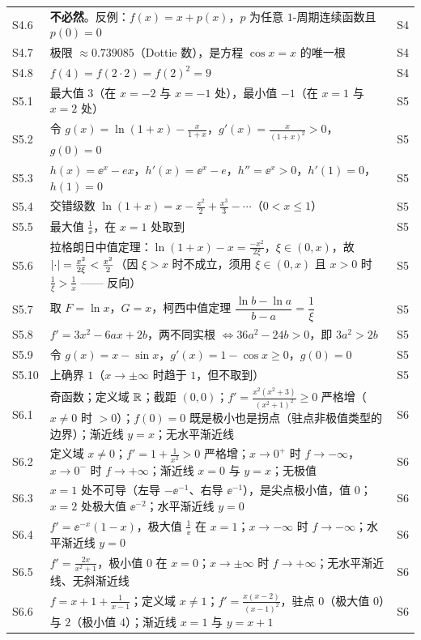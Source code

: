 \begin{longtable}{@{}p{1.4cm}p{12.0cm}p{0.9cm}@{}}
S4.6 & \textbf{不必然}。反例：$f(x)=x+p(x)$，$p$ 为任意 $1$-周期连续函数且 $p(0)=0$ & S4\\
S4.7 & 极限 $\approx0.739085$（Dottie 数），是方程 $\cos x=x$ 的唯一根 & S4\\
S4.8 & $f(4)=f(2\cdot2)=f(2)^{2}=9$ & S4\\
\midrule
S5.1 & 最大值 $3$（在 $x=-2$ 与 $x=-1$ 处），最小值 $-1$（在 $x=1$ 与 $x=2$ 处） & S5\\
S5.2 & 令 $g(x)=\ln(1+x)-\frac{x}{1+x}$，$g'(x)=\frac{x}{(1+x)^{2}}>0$，$g(0)=0$ & S5\\
S5.3 & $h(x)=\ee^{x}-ex$，$h'(x)=\ee^{x}-e$，$h''=\ee^{x}>0$，$h'(1)=0$，$h(1)=0$ & S5\\
S5.4 & 交错级数 $\ln(1+x)=x-\frac{x^{2}}2+\frac{x^{3}}3-\cdots$（$0<x\leq1$）& S5\\
S5.5 & 最大值 $\frac1\ee$，在 $x=1$ 处取到 & S5\\
S5.6 & 拉格朗日中值定理：$\ln(1+x)-x=\frac{-x^{2}}{2\xi}$，$\xi\in(0,x)$，故 $\left\lvert \cdot\right\rvert=\frac{x^{2}}{2\xi}<\frac{x^{2}}{2}$（因 $\xi>x$ 时不成立，须用 $\xi\in(0,x)$ 且 $x>0$ 时 $\frac{1}{\xi}>\frac1x$ —— 反向）& S5\\
S5.7 & 取 $F=\ln x$，$G=x$，柯西中值定理 $\dfrac{\ln b-\ln a}{b-a}=\dfrac{1}{\xi}$ & S5\\
S5.8 & $f'=3x^{2}-6ax+2b$，两不同实根 $\iff 36a^{2}-24b>0$，即 $3a^{2}>2b$ & S5\\
S5.9 & 令 $g(x)=x-\sin x$，$g'(x)=1-\cos x\geq0$，$g(0)=0$ & S5\\
S5.10 & 上确界 $1$（$x\to\pm\infty$ 时趋于 $1$，但不取到）& S5\\
\midrule
S6.1 & 奇函数；定义域 $\mathbb{R}$；截距 $(0,0)$；$f'=\frac{x^{2}(x^{2}+3)}{(x^{2}+1)^{2}}\geq0$ 严格增（$x\neq0$ 时 $>0$）；$f(0)=0$ 既是极小也是拐点（驻点非极值类型的边界）；渐近线 $y=x$；无水平渐近线 & S6\\
S6.2 & 定义域 $x\neq0$；$f'=1+\frac1{x^{2}}>0$ 严格增；$x\to0^{+}$ 时 $f\to-\infty$，$x\to0^{-}$ 时 $f\to+\infty$；渐近线 $x=0$ 与 $y=x$；无极值 & S6\\
S6.3 & $x=1$ 处不可导（左导 $-\ee^{-1}$、右导 $\ee^{-1}$），是尖点极小值，值 $0$；$x=2$ 处极大值 $\ee^{-2}$；水平渐近线 $y=0$ & S6\\
S6.4 & $f'=\ee^{-x}(1-x)$，极大值 $\frac1\ee$ 在 $x=1$；$x\to-\infty$ 时 $f\to-\infty$；水平渐近线 $y=0$ & S6\\
S6.5 & $f'=\frac{2x}{x^{2}+1}$，极小值 $0$ 在 $x=0$；$x\to\pm\infty$ 时 $f\to+\infty$；无水平渐近线、无斜渐近线 & S6\\
S6.6 & $f=x+1+\frac1{x-1}$；定义域 $x\neq1$；$f'=\frac{x(x-2)}{(x-1)^{2}}$，驻点 $0$（极大值 $0$）与 $2$（极小值 $4$）；渐近线 $x=1$ 与 $y=x+1$ & S6\\
\bottomrule
\end{longtable}

